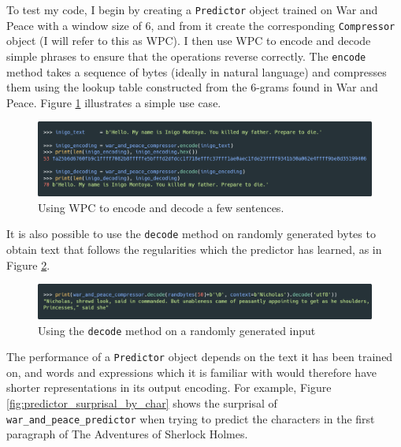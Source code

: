 To test my code, I begin by creating a \texttt{Predictor} object trained on War and Peace with a window size of 6, and from it create the corresponding \texttt{Compressor} object (I will refer to this as WPC). I then use WPC to encode and decode simple phrases to ensure that the operations reverse correctly. The \texttt{encode} method takes a sequence of bytes (ideally in natural language) and compresses them using the lookup table constructed from the 6-grams found in War and Peace. Figure \ref{fig:inigo_encoding_decoding} illustrates a simple use case.

\begin{figure}[h]
\centering
\includegraphics[width=\textwidth]{img/inigo_encoding_decoding.png}
\caption{Using WPC to encode and decode a few sentences.}
\label{fig:inigo_encoding_decoding}
\end{figure}

It is also possible to use the \texttt{decode} method on randomly generated bytes to obtain text that follows the regularities which the predictor has learned, as in Figure \ref{fig:predictor_decoding_randomness}.

\begin{figure}[h]
\centering
\includegraphics[width=\textwidth]{img/predictor_decoding_randomness.png}
\caption{Using the \texttt{decode} method on a randomly generated input}
\label{fig:predictor_decoding_randomness}
\end{figure}

The performance of a \texttt{Predictor} object depends on the text it has been trained on, and words and expressions which it is familiar with would therefore have shorter representations in its output encoding. For example, Figure \ref{fig:predictor_surprisal_by_char} shows the surprisal of \texttt{war\_and\_peace\_predictor} when trying to predict the characters in the first paragraph of The Adventures of Sherlock Holmes.

